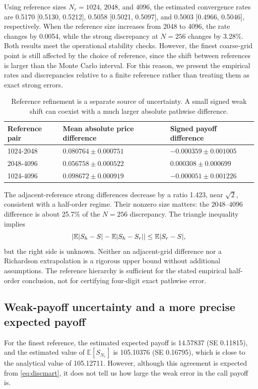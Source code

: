 Using reference sizes $N_r=1024$, $2048$, and $4096$, the estimated convergence rates are 0.5170 [0.5130, 0.5212], 0.5058 [0.5021, 0.5097], and 0.5003 [0.4966, 0.5046], respectively. When the reference size increases from 2048 to 4096, the rate changes by 0.0054, while the strong discrepancy at $N=256$ changes by 3.28\%. Both results meet the operational stability checks. However, the finest coarse-grid point is still affected by the choice of reference, since the shift between references is larger than the Monte Carlo interval. For this reason, we present the empirical rates and discrepancies relative to a finite reference rather than treating them as exact strong errors.

\begin{table}[H]\centering\small
\caption{Reference refinement is a separate source of uncertainty. A small signed weak shift can coexist with a much larger absolute pathwise difference.}\label{tab:ref}
\begin{tabular}{lll}\toprule
Reference pair & Mean absolute price difference & Signed payoff difference\\\midrule
1024-2048 & $0.080764\pm 0.000751$ & $-0.000359\pm 0.001005$\\
2048-4096 & $0.056758\pm 0.000522$ & $0.000308\pm 0.000699$\\
1024-4096 & $0.098672\pm 0.000919$ & $-0.000051\pm 0.001226$\\
\bottomrule\end{tabular}\end{table}
The adjacent-reference strong differences decrease by a ratio 1.423, near $\sqrt2$, consistent with a half-order regime. Their nonzero size matters: the $2048$--$4096$ difference is about 25.7\% of the $N=256$ discrepancy. The triangle inequality implies
\begin{equation}\label{eq:reftriangle}
\left|\mathbb E|S_h-S|-\mathbb E|S_h-S_r|\right|\le\mathbb E|S_r-S|,
\end{equation}
but the right side is unknown. Neither an adjacent-grid difference nor a Richardson extrapolation is a rigorous upper bound without additional assumptions. The reference hierarchy is sufficient for the stated empirical half-order conclusion, not for certifying four-digit exact pathwise error.

\subsection{Weak-payoff uncertainty and a more precise expected payoff}
For the finest reference, the estimated expected payoff is 14.57837 (SE 0.11815), and the estimated value of $\mathbb{E}[S_{N_r}]$ is 105.10376 (SE 0.16795), which is close to the analytical value of 105.12711. However, although this agreement is expected from \eqref{eq:discmart}, it does not tell us how large the weak error in the call payoff is.


